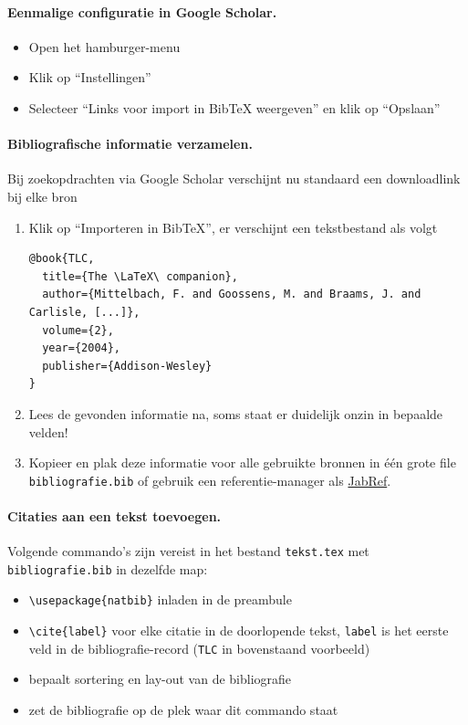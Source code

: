 \documentclass[kulak]{kulakarticle} %
\begin{document}
\paragraph{Eenmalige configuratie in Google Scholar.}

\begin{itemize}
	\item Open het hamburger-menu
	\item Klik op ``Instellingen''
	\item Selecteer ``Links voor import in BibTeX weergeven'' en klik op ``Opslaan''
\end{itemize}

\paragraph{Bibliografische informatie verzamelen.}

Bij zoekopdrachten via Google Scholar verschijnt nu standaard een downloadlink bij elke bron
\begin{enumerate}
	\item Klik op ``Importeren in BibTeX'', er verschijnt een tekstbestand als volgt
	      \begin{verbatim}
@book{TLC,
  title={The \LaTeX\ companion},
  author={Mittelbach, F. and Goossens, M. and Braams, J. and Carlisle, [...]},
  volume={2},
  year={2004},
  publisher={Addison-Wesley}
}
\end{verbatim}
	\item Lees de gevonden informatie na, soms staat er duidelijk onzin in bepaalde velden!
	\item Kopieer en plak deze informatie voor alle gebruikte bronnen in één grote file \texttt{bibliografie.bib} of gebruik een referentie-manager als \href{http://jabref.sourceforge.net/}{JabRef}.
\end{enumerate}

\paragraph{Citaties aan een tekst toevoegen.}

Volgende commando's zijn vereist in het bestand \texttt{tekst.tex} met \texttt{bibliografie.bib} in dezelfde map:

\begin{itemize}
	\item \verb+\usepackage{natbib}+ inladen in de preambule
	\item \verb+\cite{label}+ voor elke citatie in de doorlopende tekst, \texttt{label} is het eerste veld in de bibliografie-record (\texttt{TLC} in bovenstaand voorbeeld)
	\item \verb++ bepaalt sortering en lay-out van de bibliografie
	\item \verb++ zet de bibliografie op de plek waar dit commando staat
\end{itemize}
\end{document}
